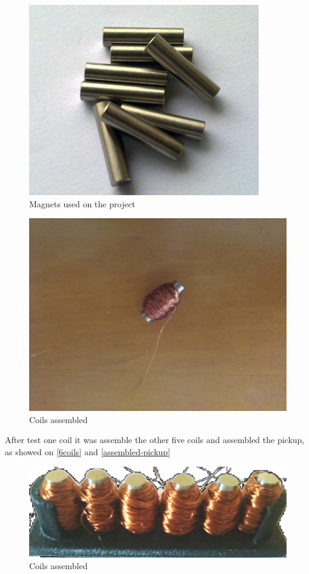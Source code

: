 \begin{figure}[!htpb]
  \centering
  \caption{Magnets used on the project}
  \label{magnets}
  \includegraphics[scale=0.3]{images/magnets}
\end{figure}

\begin{figure}[!htpb]
  \centering
  \caption{Coils assembled}
  \label{coils}
  \includegraphics[scale=0.08]{images/coils}
\end{figure}

After test one coil it was assemble the other five coils and assembled the pickup, as
showed on \autoref{6coils} and \autoref{assembled-pickup}

\begin{figure}[!htpb]
  \centering
  \caption{Coils assembled}
  \label{6coils}
  \includegraphics[scale=0.08]{images/6coils}
\end{figure}

